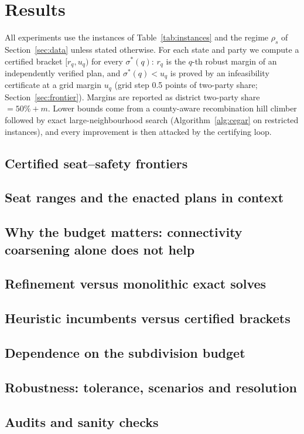\section{Results}\label{sec:results}

All experiments use the instances of Table~\ref{tab:instances} and the regime $\rho_s$ of Section~\ref{sec:data} unless stated otherwise. For each state and party we compute a certified bracket $[r_q,u_q)$ for every $\sigma^*(q)$: $r_q$ is the $q$-th robust margin of an independently verified plan, and $\sigma^*(q)<u_q$ is proved by an infeasibility certificate at a grid margin $u_q$ (grid step 0.5 points of two-party share; Section~\ref{sec:frontier}). Margins are reported as district two-party share $=50\%+m$. Lower bounds come from a county-aware recombination hill climber followed by exact large-neighbourhood search (Algorithm~\ref{alg:cegar} on restricted instances), and every improvement is then attacked by the certifying loop.

\subsection{Certified seat--safety frontiers}\label{sec:main}



\subsection{Seat ranges and the enacted plans in context}\label{sec:enacted}



\subsection{Why the budget matters: connectivity coarsening alone does not help}\label{sec:negative}



\subsection{Refinement versus monolithic exact solves}\label{sec:baseline}



\subsection{Heuristic incumbents versus certified brackets}\label{sec:heur}



\subsection{Dependence on the subdivision budget}\label{sec:budget}



\subsection{Robustness: tolerance, scenarios and resolution}\label{sec:robust}



\subsection{Audits and sanity checks}\label{sec:audit}


